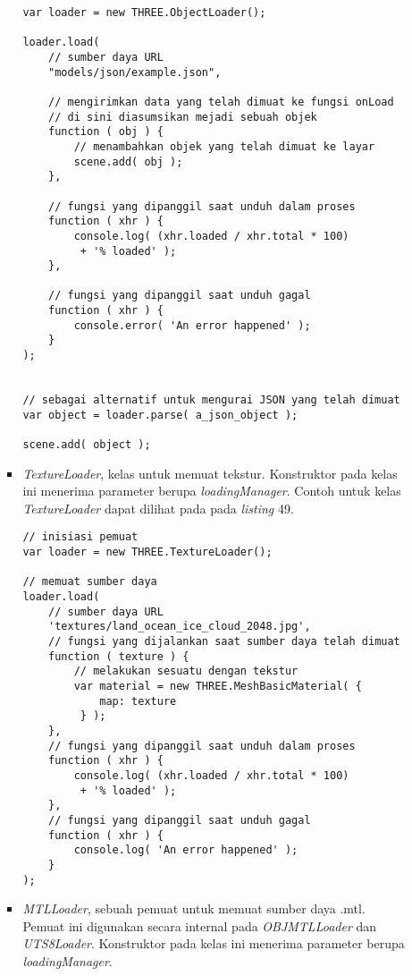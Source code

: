 \documentclass[a4paper,twoside]{article}
\begin{document}
\begin{enumerate}
\begin{itemize}
\begin{itemize}
\begin{lstlisting}[caption={Contoh penggunaan kelas {\it ObjectLoader}.},captionpos=b]
var loader = new THREE.ObjectLoader();

loader.load(
    // sumber daya URL
    "models/json/example.json",

    // mengirimkan data yang telah dimuat ke fungsi onLoad
    // di sini diasumsikan mejadi sebuah objek
    function ( obj ) {
		// menambahkan objek yang telah dimuat ke layar
        scene.add( obj );
    },

    // fungsi yang dipanggil saat unduh dalam proses
    function ( xhr ) {
        console.log( (xhr.loaded / xhr.total * 100)
         + '% loaded' );
    },

    // fungsi yang dipanggil saat unduh gagal
    function ( xhr ) {
        console.error( 'An error happened' );
    }
);


// sebagai alternatif untuk mengurai JSON yang telah dimuat
var object = loader.parse( a_json_object );

scene.add( object );
\end{lstlisting}

	\item {\it TextureLoader}, kelas untuk memuat tekstur. Konstruktor pada kelas ini menerima parameter berupa  {\it loadingManager}. Contoh untuk kelas {\it TextureLoader} dapat dilihat pada pada {\it listing} 49.
	
\begin{lstlisting}[caption={Contoh penggunaan kelas {\it TextureLoader}.},captionpos=b]
// inisiasi pemuat
var loader = new THREE.TextureLoader();

// memuat sumber daya
loader.load(
	// sumber daya URL
	'textures/land_ocean_ice_cloud_2048.jpg',
	// fungsi yang dijalankan saat sumber daya telah dimuat
	function ( texture ) {
		// melakukan sesuatu dengan tekstur
		var material = new THREE.MeshBasicMaterial( {
			map: texture
		 } );
	},
	// fungsi yang dipanggil saat unduh dalam proses
	function ( xhr ) {
		console.log( (xhr.loaded / xhr.total * 100)
		 + '% loaded' );
	},
	// fungsi yang dipanggil saat unduh gagal
	function ( xhr ) {
		console.log( 'An error happened' );
	}
);
\end{lstlisting}

	\item {\it MTLLoader}, sebuah pemuat untuk memuat sumber daya .mtl. Pemuat ini digunakan secara internal pada {\it OBJMTLLoader} dan {\it UTS8Loader}. Konstruktor pada kelas ini menerima parameter berupa  {\it loadingManager}.
	

\end{itemize}
\end{itemize}
\end{enumerate}
\end{document}
